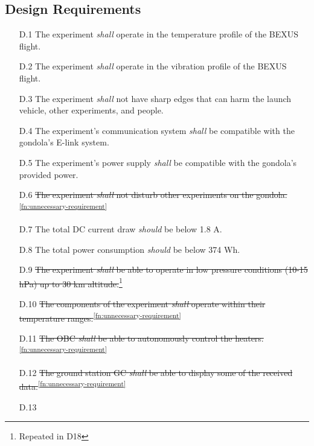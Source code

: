 \documentclass[a4paper,12pt,oneside]{article} %
\providecommand{\DIFaddbegin}{} %
\providecommand{\DIFaddend}{} %
\providecommand{\DIFdelbegin}{} %
\providecommand{\DIFdelend}{} %
\newcommand{\DIFscaledelfig}{0.5}
\newlength{\DIFdelgraphicswidth} %
\newlength{\DIFdelgraphicsheight} %
\newcommand{\DIFaddincludegraphics}[2][]{{\color{blue}\fbox{\DIFOincludegraphics[#1]{#2}}}} %
\newcommand{\DIFdelincludegraphics}[2][]{%
\sbox{\DIFdelgraphicsbox}{\DIFOincludegraphics[#1]{#2}}%
\settoboxwidth{\DIFdelgraphicswidth}{\DIFdelgraphicsbox} %
\settoboxtotalheight{\DIFdelgraphicsheight}{\DIFdelgraphicsbox} %
\scalebox{\DIFscaledelfig}{%
\parbox[b]{\DIFdelgraphicswidth}{\usebox{\DIFdelgraphicsbox}\\[-\baselineskip] \rule{\DIFdelgraphicswidth}{0em}}\llap{\resizebox{\DIFdelgraphicswidth}{\DIFdelgraphicsheight}{%
\setlength{\unitlength}{\DIFdelgraphicswidth}%
\begin{picture}(1,1)%
\thicklines\linethickness{2pt} %
{\color[rgb]{1,0,0}\put(0,0){\framebox(1,1){}}}%
{\color[rgb]{1,0,0}\put(0,0){\line( 1,1){1}}}%
{\color[rgb]{1,0,0}\put(0,1){\line(1,-1){1}}}%
\end{picture}%
}\hspace*{3pt}}} %
} %
\DeclareRobustCommand{\DIFaddbegin}{\DIFOaddbegin \let\includegraphics\DIFaddincludegraphics} %
\DeclareRobustCommand{\DIFaddend}{\DIFOaddend \let\includegraphics\DIFOincludegraphics} %
\DeclareRobustCommand{\DIFdelbegin}{\DIFOdelbegin \let\includegraphics\DIFdelincludegraphics} %
\DeclareRobustCommand{\DIFdelend}{\DIFOaddend \let\includegraphics\DIFOincludegraphics} %
\begin{document}
\begin{appendices}
\subsection{Design Requirements}

\begin{enumerate}
    \item[D.1] The experiment \textit{shall} operate in the temperature profile of the BEXUS flight\cite{BexusManual}.
    \item[D.2] The experiment \textit{shall} operate in the vibration profile of the BEXUS flight\cite{BexusManual}.
    \item[D.3] The experiment \textit{shall} not have sharp edges that can harm the launch vehicle, other experiments, and people.%
    \item[D.4] The experiment's communication system \textit{shall} be compatible with the gondola's E-link system.
    \item[D.5] The experiment's power supply \textit{shall} be compatible with the gondola's provided power.
    \item[D.6] \st{The experiment \textit{shall} not disturb other experiments on the gondola.}\textsuperscript{\ref{fn:unnecessary-requirement}}
    \item[D.7] The total DC current draw \textit{should} be below 1.8 A.
    \item[D.8] The total power consumption \textit{should} be below 374 Wh.
    \item[D.9] \DIFdelbegin %
\DIFdelend \DIFaddbegin \st{The experiment \textit{shall} be able to operate in low pressure conditions (10-15 hPa) up to 30 km altitude.}\DIFaddend \footnote{Repeated in D18\label{fn:repeat-d18}}
    \item[D.10] \st{The components of the experiment \textit{shall} operate within their temperature ranges.}\textsuperscript{\ref{fn:unnecessary-requirement}}
    \item[D.11] \st{The OBC \textit{shall} be able to autonomously control the heaters.}\textsuperscript{\ref{fn:unnecessary-requirement}}
    \item[D.12] \st{The ground station GC \textit{shall} be able to display some of the received data.}\textsuperscript{\ref{fn:unnecessary-requirement}}
    \item[D.13] \DIFdelbegin %

\end{enumerate}
\end{appendices}
\end{document}
